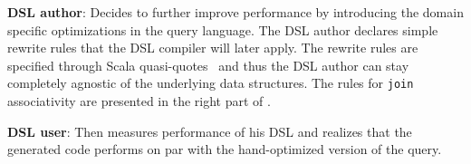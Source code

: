 \documentclass{llncs}
\newcommand{\scode}[1]{\lstinline[language=Scala,columns=fixed,basicstyle=\ttfamily,keywordstyle=\ttfamily]|#1|}
\newcommand{\code}[1]{\scode{#1}}
\begin{document}
  {\bf DSL author}: Decides to further improve performance by introducing the domain specific optimizations in the query language. The DSL author declares simple rewrite rules that the DSL compiler will later apply. The rewrite rules are specified through Scala quasi-quotes~\cite{shabalin2013quasiquotes} and thus the DSL author can stay completely agnostic of the underlying data structures. The rules for \code{join} associativity are presented in the right part of .
  
  {\bf DSL user}: Then measures performance of his DSL and realizes that the generated code performs on par with the hand-optimized version of the query.




\end{document}
